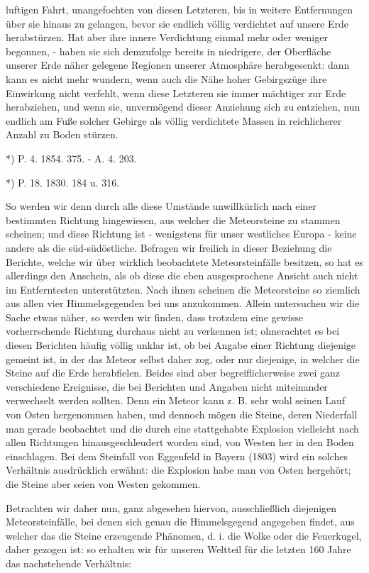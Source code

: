 \documentclass[a4paper, 11pt, oneside, polutonikogreek, german]{article}
\begin{document}
luftigen Fahrt, unangefochten von diesen Letzteren, bis in weitere Entfernungen über sie hinaus zu gelangen, bevor sie endlich völlig verdichtet auf unsere Erde herabstürzen. Hat aber ihre innere Verdichtung einmal mehr oder weniger begonnen, - haben sie sich demzufolge bereits in niedrigere, der Oberfläche unserer Erde näher gelegene Regionen unserer Atmosphäre herabgesenkt: dann kann es nicht mehr wundern, wenn auch die Nähe hoher Gebirgszüge ihre Einwirkung nicht verfehlt, wenn diese Letzteren sie immer mächtiger zur Erde herabziehen, und wenn sie, unvermögend dieser Anziehung sich zu entziehen, nun endlich am Fuße solcher Gebirge als völlig verdichtete Massen in reichlicherer Anzahl zu Boden stürzen.

*) P. 4. 1854. 375. - A. 4. 203.

*) P. 18. 1830. 184 u. 316.

So werden wir denn durch alle diese Umstände unwillkürlich nach einer bestimmten Richtung hingewiesen, aus welcher die Meteorsteine zu stammen scheinen; und diese Richtung ist - wenigstens für unser westliches Europa - keine andere als die süd-südöstliche. Befragen wir freilich in dieser Beziehung die Berichte, welche wir über wirklich beobachtete Meteorsteinfälle besitzen, so hat es allerdings den Anschein, als ob diese die eben ausgesprochene Ansicht auch nicht im Entferntesten unterstützten. Nach ihnen scheinen die Meteorsteine so ziemlich aus allen vier Himmelsgegenden bei uns anzukommen. Allein untersuchen wir die Sache etwas näher, so werden wir finden, dass trotzdem eine gewisse vorherrschende Richtung durchaus nicht zu verkennen ist; ohnerachtet es bei diesen Berichten häufig völlig unklar ist, ob bei Angabe einer Richtung diejenige gemeint ist, in der das Meteor selbst daher zog, oder nur diejenige, in welcher die Steine auf die Erde herabfielen. Beides sind aber begreiflicherweise zwei ganz verschiedene Ereignisse, die bei Berichten und Angaben nicht miteinander verwechselt werden sollten. Denn ein Meteor kann z. B. sehr wohl seinen Lauf von Osten hergenommen haben, und dennoch mögen die Steine, deren Niederfall man gerade beobachtet und die durch eine stattgehabte Explosion vielleicht nach allen Richtungen hinausgeschleudert worden sind, von Westen her in den Boden einschlagen. Bei dem Steinfall von Eggenfeld in Bayern (1803) wird ein solches Verhältnis ausdrücklich erwähnt: die Explosion habe man von Osten hergehört; die Steine aber seien von Westen gekommen.

Betrachten wir daher nun, ganz abgesehen hiervon, ausschließlich diejenigen Meteorsteinfälle, bei denen sich genau die Himmelsgegend angegeben findet, aus welcher das die Steine erzeugende Phänomen, d. i. die Wolke oder die Feuerkugel, daher gezogen ist: so erhalten wir für unseren Weltteil für die letzten 160 Jahre das nachstehende Verhältnis:
\end{document}
